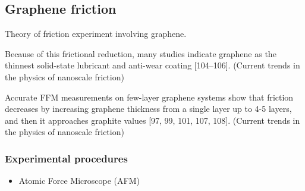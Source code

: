 



\subsection{Graphene friction}
Theory of friction experiment involving graphene.


Because of this frictional reduction, many studies indicate graphene as the
thinnest solid-state lubricant and anti-wear coating [104–106]. (Current trends
in the physics of nanoscale friction)


Accurate FFM measurements on few-layer graphene systems show that friction
decreases by increasing graphene thickness from a single layer up to 4-5 layers,
and then it approaches graphite values [97, 99, 101, 107, 108]. (Current trends
in the physics of nanoscale friction)


\subsubsection{Experimental procedures}

\begin{itemize}
  \item Atomic Force Microscope (AFM)
\end{itemize}





